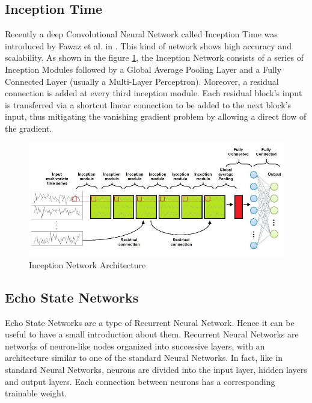 \subsection{Inception Time}
Recently a deep Convolutional Neural Network called Inception Time was introduced by Fawaz et al. in \cite{IsmailFawaz2020InceptionTime:Classification}. This kind of network shows high accuracy and scalability. As shown in the figure \ref{fig:a2}, the Inception Network consists of a series of Inception Modules followed by a Global Average Pooling Layer and a Fully Connected Layer (usually a Multi-Layer Perceptron). Moreover, a residual connection is added at every third inception module. Each residual block’s input is transferred via a shortcut linear connection to be added to the next block’s input, thus mitigating the vanishing gradient problem by allowing a direct flow of the gradient.

\begin{figure}[H]
    \centering
    \begin{minipage}[b]{\textwidth}
        \includegraphics[width=\textwidth]{manuscript/src/figures/project/app2.jpeg}
    \end{minipage}
    \caption{Inception Network Architecture \cite{IsmailFawaz2020InceptionTime:Classification}}
    \label{fig:a2}
\end{figure}


\subsection{Echo State Networks}

Echo State Networks \cite{Bianchi2018ReservoirSeries} are a type of Recurrent Neural Network. Hence it can be useful to have a small introduction about them. Recurrent Neural Networks are networks of neuron-like nodes organized into successive layers, with an architecture similar to one of the standard Neural Networks. In fact, like in standard Neural Networks, neurons are divided into the input layer, hidden layers and output layers. Each connection between neurons has a corresponding trainable weight.  

